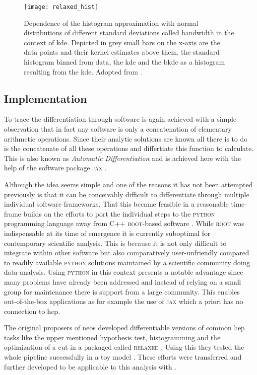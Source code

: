 \begin{figure}
    \centering
    \texttt{[image: relaxed\_hist]}
    \caption[]{Dependence of the histogram approximation with normal distributions of different standard deviations called bandwidth in the context of \ac{kde}. Depicted in grey small bars on the x-axis are the data points and their kernel estimates above them, the standard histogram binned from data, the \ac{kde} and the \ac{bkde} as a histogram resulting from the \ac{kde}. Adopted from \citep{Simpson_2023}.}
    \label{fig:relaxed_hist}
\end{figure}

\subsection{Implementation}
To trace the differentiation through software is again achieved with a simple observation that in fact any software is only a concatenation of elementary arithmetic operations. Since their analytic solutions are known all there is to do is the concatenate of all these operations and differtiate this function to calculate. This is also known as \textit{Automatic Differentiation} and is achieved here with the help of the software package \textsc{jax} \citep{jax2018github}.

Although the idea seems simple and one of the reasons it has not been attempted previously is that it can be conceivably difficult to differentiate through multiple individual software frameworks. That this became feasible in a reasonable time-frame builds on the efforts to port the individual steps to the \textsc{python} programming language away from C++ \textsc{root}-based software \citep{ANTCHEVA20092499}. While \textsc{root} was indispensable at its time of emergence it is currently suboptimal for contemporary scientific analysis. This is because it is not only difficult to integrate within other software but also comparatively user-unfriendly compared to readily available \textsc{python} solutions maintained by a scientific community doing data-analysis. Using \textsc{python} in this context presents a notable advantage since many problems have already been addressed and instead of relying on a small group for maintenance there is support from a large community. This enables out-of-the-box applications as for example the use of \textsc{jax} which a priori has no connection to \ac{hep}. 

The original proposers \citet{Simpson_2023} of \ac{neos} developed differentiable versions of common \ac{hep} tasks like the upper mentioned hypothesis test, histogramming and the optimization of a cut in a packaged called \textsc{relaxed} \citep{Simpson_relaxed_version_0_3_0_2023}. Using this they tested the whole pipeline successfully in a toy model \citep{Simpson_neos_version_0_2_0_2021}. These efforts were transferred and further developed to be applicable to this analysis with \citep{hh_neos}. 
